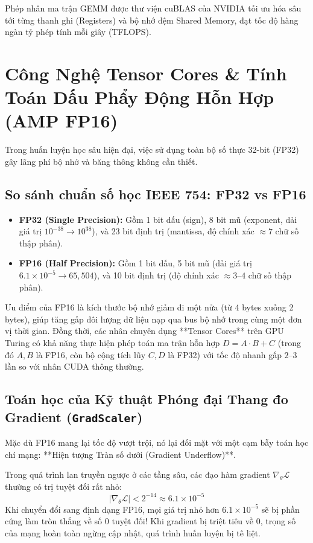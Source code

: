 \documentclass[11pt,a4paper]{report}
\begin{document}
Phép nhân ma trận GEMM được thư viện cuBLAS của NVIDIA tối ưu hóa sâu tới từng thanh ghi (Registers) và bộ nhớ đệm Shared Memory, đạt tốc độ hàng ngàn tỷ phép tính mỗi giây (TFLOPS).

\section{Công Nghệ Tensor Cores \& Tính Toán Dấu Phẩy Động Hỗn Hợp (AMP FP16)}

Trong huấn luyện học sâu hiện đại, việc sử dụng toàn bộ số thực 32-bit (FP32) gây lãng phí bộ nhớ và băng thông không cần thiết.

\subsection{So sánh chuẩn số học IEEE 754: FP32 vs FP16}
\begin{itemize}
    \item \textbf{FP32 (Single Precision):} Gồm 1 bit dấu (sign), 8 bit mũ (exponent, dải giá trị $10^{-38} \to 10^{38}$), và 23 bit định trị (mantissa, độ chính xác $\approx 7$ chữ số thập phân).
    \item \textbf{FP16 (Half Precision):} Gồm 1 bit dấu, 5 bit mũ (dải giá trị $6.1 \times 10^{-5} \to 65{,}504$), và 10 bit định trị (độ chính xác $\approx 3\text{--}4$ chữ số thập phân).
\end{itemize}

Ưu điểm của FP16 là kích thước bộ nhớ giảm đi một nửa (từ 4 bytes xuống 2 bytes), giúp tăng gấp đôi lượng dữ liệu nạp qua bus bộ nhớ trong cùng một đơn vị thời gian. Đồng thời, các nhân chuyên dụng **Tensor Cores** trên GPU Turing có khả năng thực hiện phép toán ma trận hỗn hợp $D = A \cdot B + C$ (trong đó $A, B$ là FP16, còn bộ cộng tích lũy $C, D$ là FP32) với tốc độ nhanh gấp $2\text{--}3$ lần so với nhân CUDA thông thường.

\subsection{Toán học của Kỹ thuật Phóng đại Thang đo Gradient (\texttt{GradScaler})}
Mặc dù FP16 mang lại tốc độ vượt trội, nó lại đối mặt với một cạm bẫy toán học chí mạng: **Hiện tượng Tràn số dưới (Gradient Underflow)**.

Trong quá trình lan truyền ngược ở các tầng sâu, các đạo hàm gradient $\nabla_\theta \mathcal{L}$ thường có trị tuyệt đối rất nhỏ:
\begin{equation}
    |\nabla_\theta \mathcal{L}| < 2^{-14} \approx 6.1 \times 10^{-5}
\end{equation}
Khi chuyển đổi sang định dạng FP16, mọi giá trị nhỏ hơn $6.1 \times 10^{-5}$ sẽ bị phần cứng làm tròn thẳng về số 0 tuyệt đối! Khi gradient bị triệt tiêu về 0, trọng số của mạng hoàn toàn ngừng cập nhật, quá trình huấn luyện bị tê liệt.
\end{document}
